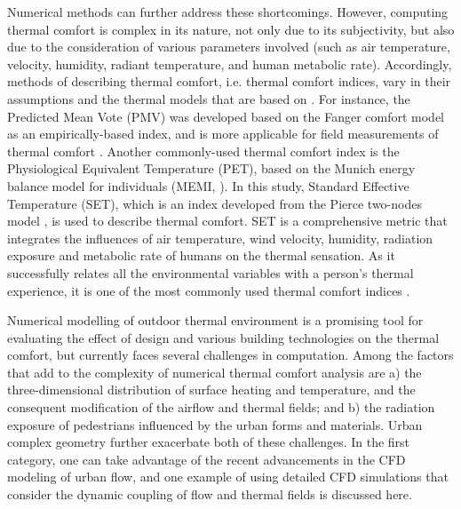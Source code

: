 \documentclass[smallextended]{svjour3}
\begin{document}
Numerical methods can further address these shortcomings. However, computing thermal comfort is complex in its nature, not only due to its subjectivity, but also due to the consideration of various parameters involved (such as air temperature, velocity, humidity, radiant temperature, and human metabolic rate). Accordingly, methods of describing thermal comfort, i.e. thermal comfort indices, vary in their assumptions and the thermal models that are based on \citep{gagge1971effective,azer1977,epstein2006thermal,honjo2009thermal}. For instance, the Predicted Mean Vote (PMV) was developed based on the Fanger comfort model \citep{fanger1967calculation, fanger1972thermal} as an empirically-based index, and is more applicable for field measurements of thermal comfort \citep{ye2003new}. Another commonly-used thermal comfort index is the Physiological Equivalent Temperature (PET), based on the Munich energy balance model for individuals (MEMI, \citet{honjo2009thermal}). In this study, Standard Effective Temperature (SET), which is an index developed from the Pierce two-nodes model \citep{oohori1984comparison}, is used to describe thermal comfort.  SET is a comprehensive metric that integrates the influences of air temperature, wind velocity, humidity,  radiation exposure and metabolic rate of humans on the thermal sensation. As it successfully relates all the environmental variables with a person’s thermal experience, it is one of the most commonly used thermal comfort indices \citep{ye2003new}. 

\begin{table}[!t]
  \begin{framed}
  \footnotesize
    \printnomenclature
  \end{framed}
\end{table}
Numerical modelling of outdoor thermal environment is a promising tool for evaluating the effect of design and various building technologies on the thermal comfort, but currently faces several challenges in computation.  Among the factors that add to the complexity of numerical thermal comfort analysis are a) the three-dimensional distribution of surface heating and temperature, and the consequent modification of the airflow and thermal fields; and b) the radiation exposure of pedestrians influenced by the urban forms and materials.  Urban complex geometry further exacerbate both of these challenges. In the first category, one can take advantage of the recent advancements in the CFD modeling of urban flow, and one example of using detailed CFD simulations that consider the dynamic coupling of flow and thermal fields is discussed here. 
\end{document}

